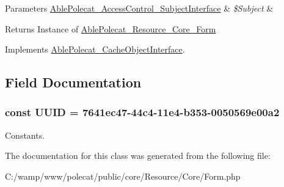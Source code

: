 \begin{DoxyParams}[1]{Parameters}
\hyperlink{interface_able_polecat___access_control___subject_interface}{Able\+Polecat\+\_\+\+Access\+Control\+\_\+\+Subject\+Interface} & {\em \$\+Subject} & \\
\hline
\end{DoxyParams}
\begin{DoxyReturn}{Returns}
Instance of \hyperlink{class_able_polecat___resource___core___form}{Able\+Polecat\+\_\+\+Resource\+\_\+\+Core\+\_\+\+Form} 
\end{DoxyReturn}


Implements \hyperlink{interface_able_polecat___cache_object_interface_a3f2135f6ad45f51d075657f6d20db2cd}{Able\+Polecat\+\_\+\+Cache\+Object\+Interface}.



\subsection{Field Documentation}
\hypertarget{class_able_polecat___resource___core___form_a74b892c8c0b86bf9d04c5819898c51e7}{}
\subsubsection[{U\+U\+I\+D}]{\setlength{\rightskip}{0pt plus 5cm}const U\+U\+I\+D = \textquotesingle{}7641ec47-\/44c4-\/11e4-\/b353-\/0050569e00a2\textquotesingle{}}\label{class_able_polecat___resource___core___form_a74b892c8c0b86bf9d04c5819898c51e7}
Constants. 

The documentation for this class was generated from the following file\+:\begin{DoxyCompactItemize}
\item 
C\+:/wamp/www/polecat/public/core/\+Resource/\+Core/Form.\+php\end{DoxyCompactItemize}
